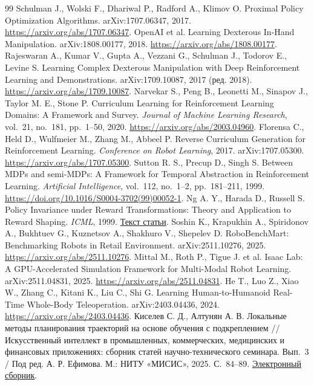 \documentclass{misisarticle}
\begin{document}
\begin{thebibliography}{99}
Schulman J., Wolski F., Dhariwal P., Radford A., Klimov O. Proximal Policy Optimization Algorithms. arXiv:1707.06347, 2017. \url{https://arxiv.org/abs/1707.06347}.
OpenAI et al. Learning Dexterous In-Hand Manipulation. arXiv:1808.00177, 2018. \url{https://arxiv.org/abs/1808.00177}.
Rajeswaran A., Kumar V., Gupta A., Vezzani G., Schulman J., Todorov E., Levine S. Learning Complex Dexterous Manipulation with Deep Reinforcement Learning and Demonstrations. arXiv:1709.10087, 2017 (ред. 2018). \url{https://arxiv.org/abs/1709.10087}.
Narvekar S., Peng B., Leonetti M., Sinapov J., Taylor M. E., Stone P. Curriculum Learning for Reinforcement Learning Domains: A Framework and Survey. \textit{Journal of Machine Learning Research}, vol.~21, no.~181, pp.~1--50, 2020. \url{https://arxiv.org/abs/2003.04960}.
Florensa C., Held D., Wulfmeier M., Zhang M., Abbeel P. Reverse Curriculum Generation for Reinforcement Learning. \textit{Conference on Robot Learning}, 2017. arXiv:1707.05300. \url{https://arxiv.org/abs/1707.05300}.
Sutton R. S., Precup D., Singh S. Between MDPs and semi-MDPs: A Framework for Temporal Abstraction in Reinforcement Learning. \textit{Artificial Intelligence}, vol.~112, no.~1--2, pp.~181--211, 1999. \url{https://doi.org/10.1016/S0004-3702(99)00052-1}.
Ng A. Y., Harada D., Russell S. Policy Invariance under Reward Transformations: Theory and Application to Reward Shaping. \textit{ICML}, 1999. \href{https://ai.stanford.edu/~ang/papers/shaping-icml99.pdf}{Текст статьи}.
Soshin K., Krapukhin A., Spiridonov A., Bukhtuev G., Kuznetsov A., Shakhuro V., Shepelev D. RoboBenchMart: Benchmarking Robots in Retail Environment. arXiv:2511.10276, 2025. \url{https://arxiv.org/abs/2511.10276}.
Mittal M., Roth P., Tigue J. et al. Isaac Lab: A GPU-Accelerated Simulation Framework for Multi-Modal Robot Learning. arXiv:2511.04831, 2025. \url{https://arxiv.org/abs/2511.04831}.
He T., Luo Z., Xiao W., Zhang C., Kitani K., Liu C., Shi G. Learning Human-to-Humanoid Real-Time Whole-Body Teleoperation. arXiv:2403.04436, 2024. \url{https://arxiv.org/abs/2403.04436}.
Киселев С. Д., Алтунян А. В. Локальные методы планирования траекторий на основе обучения с подкреплением // Искусственный интеллект в промышленных, коммерческих, медицинских и финансовых приложениях: сборник статей научно-технического семинара. Вып.~3 / Под ред. А. Р. Ефимова. М.: НИТУ «МИСИС», 2025. С.~84--89. \href{https://misis.ru/files/-/7030ef7ab572d5227e50a55006446a76/kik_2024_2.pdf}{Электронный сборник}.

\end{thebibliography}
\end{document}
